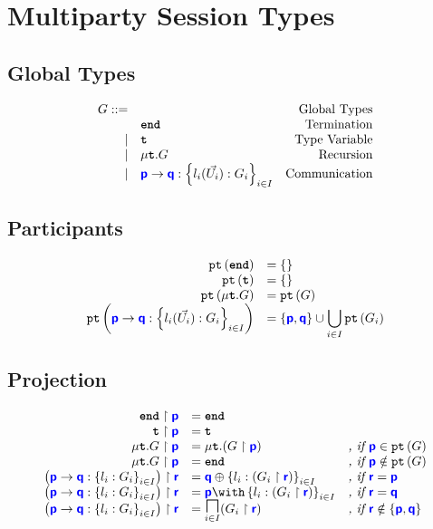 \documentclass{article}
\begin{document}
\section{Multiparty Session Types}

\subsection{Global Types}

\doublespacing
\[
\begin{array}{rlr}
    G ::= & & \text{Global Types} \\
     & \textbf{\texttt{end}} & \text{Termination} \\
	\mid & \textbf{\texttt{t}} & \text{Type Variable} \\
	\mid & \mu\textbf{\texttt{t}}.{G} & \text{Recursion} \\
	\mid & {\color{blue}\bm{\mathsf{p}}} \to {\color{blue}\bm{\mathsf{q}}} : \left\{ {l_i(\vec{U_i}): G_i} \right\}_{i \in I} & \text{Communication} \\
\end{array}
\]
\singlespacing

\subsection{Participants}
\doublespacing
\[
\begin{array}{>{\displaystyle}r>{\displaystyle}l}
		\pt{\tyend} & = \left\{\right\} \\
		\pt{\tyrecvar} & = \left\{\right\} \\
		\pt{\tyrec{G}} & = \pt{G} \\
		\pt{\gcomm{p}{q}{l_i(\vec{U_i}): G_i}{i \in I}} & = \left\{\role{p},\role{q}\right\} \cup \bigcup_{i \in I}\pt{G_i} \\
\end{array}
\]
\singlespacing

\subsection{Projection}
\doublespacing
\[
\begin{array}{>{\displaystyle}r>{\displaystyle}l>{\displaystyle}l}
		\proj{\tyend}{p} & = \tyend & \\
		\proj{\tyrecvar}{p} & = \tyrecvar & \\
		\proj{\tyrec{G}}{p} & = \tyrec{(\proj{G}{p})} & \textit{, if }\role{p} \in \pt{G}\\
		\proj{\tyrec{G}}{p} & = \tyend & \textit{, if }\role{p} \notin \pt{G}\\
		\proj{\left(\gcomm{p}{q}{l_i: G_i}{i \in I}\right)}{r} & = \tysel{q}{l_i: (\proj{G_i}{r})}{i \in I} & \textit{, if }\role{r} = \role{p} \\
		\proj{\left(\gcomm{p}{q}{l_i: G_i}{i \in I}\right)}{r} & = \tybra{p}{l_i: (\proj{G_i}{r})}{i \in I} & \textit{, if }\role{r} = \role{q} \\
		\proj{\left(\gcomm{p}{q}{l_i: G_i}{i \in I}\right)}{r} & = \underset{i \in I}{\tyMERGEOP}{(\proj{G_i}{r})} & \textit{, if }\role{r} \notin \left\{\role{p},\role{q}\right\}
\end{array}
\]
\singlespacing
\end{document}
